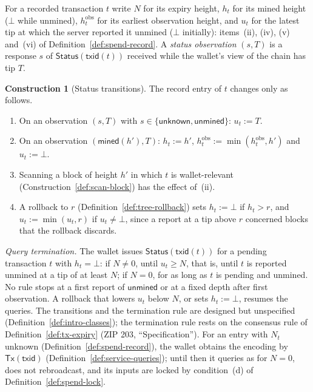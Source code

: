 \documentclass[11pt,a4paper]{article}
\theoremstyle{definition}
\newtheorem{construction}[theorem]{Construction}
\begin{document}
For a recorded transaction $t$ write $N$ for its expiry height, $h_t$ for
its mined height ($\bot$ while unmined), $h^{\mathrm{obs}}_t$ for its
earliest observation height, and $u_t$ for the latest tip at which the
server reported it unmined ($\bot$ initially): items~(ii), (iv), (v)
and~(vi) of Definition~\ref{def:spend-record}. A \emph{status observation}
$(s, T)$ is a response $s$ of $\mathsf{Status}(\mathsf{txid}(t))$ received
while the wallet's view of the chain has tip $T$.

\begin{construction}[Status transitions]
The record entry of $t$ changes only as follows.
\begin{enumerate}[label=(\roman*)]
\item On an observation $(s, T)$ with $s \in \{\mathsf{unknown},
  \mathsf{unmined}\}$: $u_t := T$.
\item On an observation $(\mathsf{mined}(h'), T)$: $h_t := h'$,
  $h^{\mathrm{obs}}_t := \min(h^{\mathrm{obs}}_t, h')$ and $u_t := \bot$.
\item Scanning a block of height $h'$ in which $t$ is wallet-relevant
  (Construction~\ref{def:scan-block}) has the effect of~(ii).
\item A rollback to $r$ (Definition~\ref{def:tree-rollback}) sets $h_t :=
  \bot$ if $h_t > r$, and $u_t := \min(u_t, r)$ if $u_t \ne \bot$, since
  a report at a tip above $r$ concerned blocks that the rollback discards.
\end{enumerate}
\emph{Query termination.} The wallet issues $\mathsf{Status}(\mathsf{txid}(t))$
for a pending transaction $t$ with $h_t = \bot$: if $N \ne 0$, until $u_t
\ge N$, that is, until $t$ is reported unmined at a tip of at least $N$; if
$N = 0$, for as long as $t$ is pending and unmined. No rule stops at a
first report of $\mathsf{unmined}$ or at a fixed depth after first
observation. A rollback that lowers $u_t$ below $N$, or sets $h_t := \bot$,
resumes the queries. The transitions and the termination rule are designed
but unspecified (Definition~\ref{def:intro-classes}); the termination rule
rests on the consensus rule of Definition~\ref{def:tx-expiry} (ZIP 203,
``Specification''). For an entry with $N_t$ unknown
(Definition~\ref{def:spend-record}), the wallet obtains the encoding by
$\mathsf{Tx}(\mathsf{txid})$ (Definition~\ref{def:service-queries}); until
then it queries as for $N = 0$, does not rebroadcast, and its inputs are
locked by condition~(d) of Definition~\ref{def:spend-lock}.
\end{construction}
\end{document}
